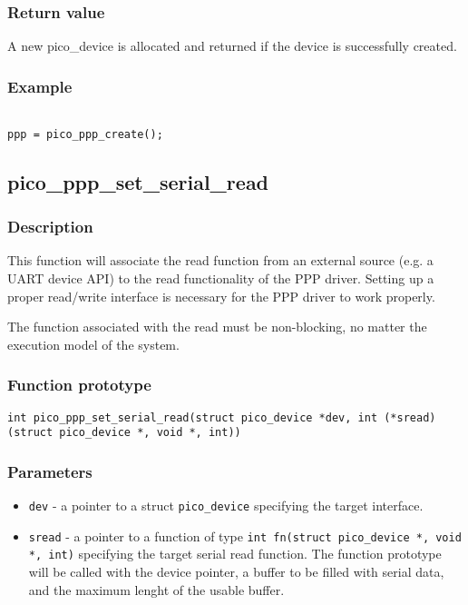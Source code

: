\subsubsection*{Return value}
A new pico\_device is allocated and returned if the device is successfully created.

\subsubsection*{Example}
\begin{verbatim}

ppp = pico_ppp_create();

\end{verbatim}

\subsection{pico\_ppp\_set\_serial\_read}
\subsubsection*{Description}
This function will associate the read function from an external source (e.g. a UART device API)
to the read functionality of the PPP driver. Setting up a proper read/write interface is necessary
for the PPP driver to work properly.

The function associated with the read must be non-blocking, no matter the execution model of the system.

\subsubsection*{Function prototype}
\texttt{int pico\_ppp\_set\_serial\_read(struct pico\_device *dev, int (*sread)(struct pico\_device *, void *, int))}

\subsubsection*{Parameters}
\begin{itemize}[noitemsep]
\item \texttt{dev} - a pointer to a struct \texttt{pico\_device} specifying the target interface.
\item \texttt{sread} - a pointer to a function of type \texttt{int fn(struct pico\_device *, void *, int)} 
    specifying the target serial read function. The function prototype will be called with the device pointer,
    a buffer to be filled with serial data, and the maximum lenght of the usable buffer.
\end{itemize}

